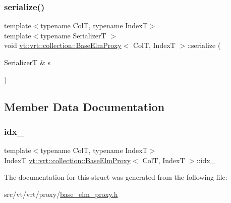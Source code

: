 \subsubsection{\texorpdfstring{serialize()}{serialize()}}
{\footnotesize\ttfamily template$<$typename ColT, typename IndexT$>$ \\
template$<$typename SerializerT $>$ \\
void \hyperlink{structvt_1_1vrt_1_1collection_1_1_base_elm_proxy}{vt\+::vrt\+::collection\+::\+Base\+Elm\+Proxy}$<$ ColT, IndexT $>$\+::serialize (\begin{DoxyParamCaption}\item[{SerializerT \&}]{s }\end{DoxyParamCaption})\hspace{0.3cm}{\ttfamily [inline]}}



\subsection{Member Data Documentation}
\mbox{\label{structvt_1_1vrt_1_1collection_1_1_base_elm_proxy_a3c3a673dc49a7e03703b899e6b135d47}} 
\subsubsection{\texorpdfstring{idx\+\_\+}{idx\_}}
{\footnotesize\ttfamily template$<$typename ColT, typename IndexT$>$ \\
IndexT \hyperlink{structvt_1_1vrt_1_1collection_1_1_base_elm_proxy}{vt\+::vrt\+::collection\+::\+Base\+Elm\+Proxy}$<$ ColT, IndexT $>$\+::idx\+\_\+\hspace{0.3cm}{\ttfamily [protected]}}



The documentation for this struct was generated from the following file\+:\begin{DoxyCompactItemize}
\item 
src/vt/vrt/proxy/\hyperlink{base__elm__proxy_8h}{base\+\_\+elm\+\_\+proxy.\+h}\end{DoxyCompactItemize}
